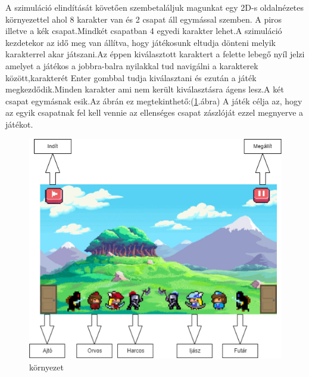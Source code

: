 





A szimuláció elindítását követően  szembetaláljuk magunkat egy 2D-s oldalnézetes környezettel ahol 8 karakter van és 2 csapat áll egymással szemben. A piros illetve a kék csapat.Mindkét csapatban 4 egyedi karakter lehet.A szimuláció kezdetekor az idő meg van állítva, hogy játékosunk eltudja dönteni melyik karakterrel akar játszani.Az éppen kiválasztott karaktert a felette lebegő nyíl jelzi amelyet a játékos a jobbra-balra nyilakkal tud navigálni a karakterek között,karakterét Enter gombbal tudja kiválasztani és ezután a játék megkezdődik.Minden karakter ami nem került kiválasztásra ágens lesz.A két csapat egymásnak esik.Az ábrán ez megtekinthető:(\ref{fig:scene}.ábra)
\newline
A játék célja az, hogy az egyik csapatnak fel kell vennie az ellenséges csapat zászlóját ezzel megnyerve a játékot.


\begin{figure}[!ht]
	\centering
	\includegraphics[width=\textwidth]{images/scene.png}
    \caption{környezet}
    \label{fig:scene}
\end{figure}

